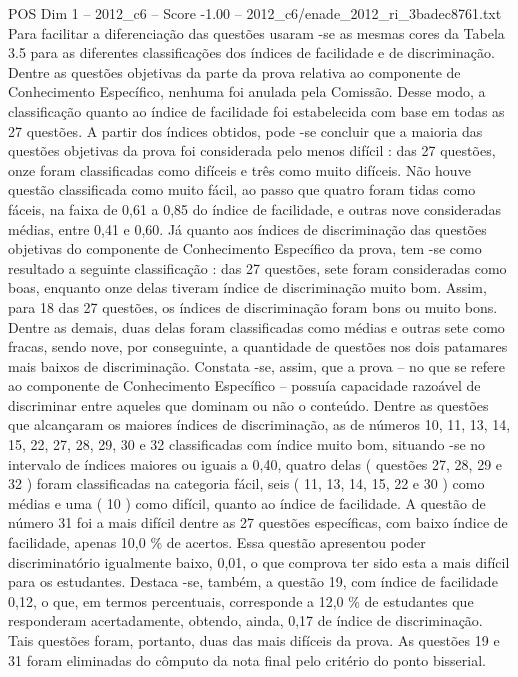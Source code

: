 \begin{textsample}{POS Dim 1 – 2012\_c6 – Score -1.00 – 2012\_c6/enade\_2012\_ri\_3badec8761.txt}
Para facilitar a diferenciação das questões usaram -se as mesmas cores da Tabela 3.5 para as diferentes classificações dos índices de facilidade e de discriminação.
Dentre as questões objetivas da parte da prova relativa ao componente de Conhecimento Específico, nenhuma foi anulada pela Comissão.
Desse modo, a classificação quanto ao índice de facilidade foi estabelecida com base em todas as 27 questões.
A partir dos índices obtidos, pode -se concluir que a maioria das questões objetivas da prova foi considerada pelo menos difícil : das 27 questões, onze foram classificadas como difíceis e três como muito difíceis.
Não houve questão classificada como muito fácil, ao passo que quatro foram tidas como fáceis, na faixa de 0,61 a 0,85 do índice de facilidade, e outras nove consideradas médias, entre 0,41 e 0,60.
Já quanto aos índices de discriminação das questões objetivas do componente de Conhecimento Específico da prova, tem -se como resultado a seguinte classificação : das 27 questões, sete foram consideradas como boas, enquanto onze delas tiveram índice de discriminação muito bom.
Assim, para 18 das 27 questões, os índices de discriminação foram bons ou muito bons.
Dentre as demais, duas delas foram classificadas como médias e outras sete como fracas, sendo nove, por conseguinte, a quantidade de questões nos dois patamares mais baixos de discriminação.
Constata -se, assim, que a prova – no que se refere ao componente de Conhecimento Específico – possuía capacidade razoável de discriminar entre aqueles que dominam ou não o conteúdo.
Dentre as questões que alcançaram os maiores índices de discriminação, as de números 10, 11, 13, 14, 15, 22, 27, 28, 29, 30 e 32 classificadas com índice muito bom, situando -se no intervalo de índices maiores ou iguais a 0,40, quatro delas ( questões 27, 28, 29 e 32 ) foram classificadas na categoria fácil, seis ( 11, 13, 14, 15, 22 e 30 ) como médias e uma ( 10 ) como difícil, quanto ao índice de facilidade.
A questão de número 31 foi a mais difícil dentre as 27 questões específicas, com baixo índice de facilidade, apenas 10,0 \% de acertos.
Essa questão apresentou poder discriminatório igualmente baixo, 0,01, o que comprova ter sido esta a mais difícil para os estudantes.
Destaca -se, também, a questão 19, com índice de facilidade 0,12, o que, em termos percentuais, corresponde a 12,0 \% de estudantes que responderam acertadamente, obtendo, ainda, 0,17 de índice de discriminação.
Tais questões foram, portanto, duas das mais difíceis da prova.
As questões 19 e 31 foram eliminadas do cômputo da nota final pelo critério do ponto bisserial.

\end{textsample}
